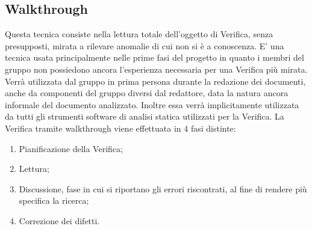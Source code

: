 \subsection{Walkthrough}
\label{11.2}
Questa tecnica consiste nella lettura totale dell'oggetto di Verifica, senza presupposti, mirata a rilevare anomalie di cui non si è a conoscenza. E' una tecnica usata principalmente nelle prime fasi del progetto in quanto i membri del gruppo non possiedono ancora l'esperienza necessaria per una Verifica più mirata. Verrà utilizzata dal gruppo in prima persona durante la redazione dei documenti, anche da componenti del gruppo diversi dal redattore, data la natura ancora informale del documento analizzato. Inoltre essa verrà implicitamente utilizzata da tutti gli strumenti software di analisi statica utilizzati per la Verifica.
La Verifica tramite walkthrough viene effettuata in 4 fasi distinte:
\begin{enumerate}
\item Pianificazione della Verifica;
\item Lettura;
\item Discussione, fase in cui si riportano gli errori riscontrati, al fine di rendere più specifica la ricerca;
\item Correzione dei difetti.
\end{enumerate}

